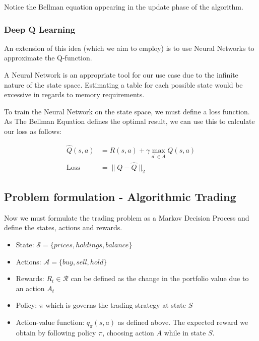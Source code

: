 \documentclass[12pt]{article}
\begin{document}
Notice the Bellman equation appearing in the update phase of the algorithm.

\subsubsection{Deep Q Learning}
An extension of this idea (which we aim to employ) is to use Neural Networks to approximate the Q-function.

A Neural Network is an appropriate tool for our use case due to the infinite nature of the state space. Estimating a table for each possible state would be excessive in regards to memory requirements.

To train the Neural Network on the state space, we must define a loss function. As The Bellman Equation defines the optimal result, we can use this to calculate our loss as follows:

$$
\begin{aligned}
\hat { Q } ( s , a ) &= R ( s , a ) + \gamma \max _ { a ^ { \prime } \in A } Q ( s , a ) \\
\text {Loss} &= \| Q - \hat { Q } \| _ { 2 }
\end{aligned}
$$







\subsection{Problem formulation - Algorithmic Trading}
Now we must formulate the trading problem as a Markov Decision Process and define the states, actions and rewards.

\begin{itemize}
	\item State: $\mathcal{S} = \{prices,holdings,balance\} $
	\item Actions: $\mathcal{A} = \{buy,sell,hold\}$
	\item Rewards: $R_{t} \in \mathcal{R}$ can be defined as the change in the portfolio value due to an action $A_{t}$
	\item Policy: $\pi$ which is governs the trading strategy at state $S$
	\item Action-value function: $q_{\pi}(s,a)$ as defined above. The expected reward we obtain by following policy $\pi$, choosing action $A$ while in state $S$.
\end{itemize}
\end{document}

